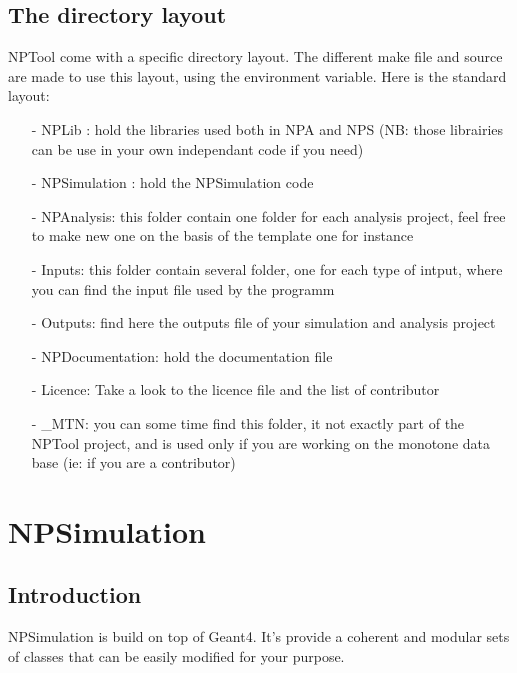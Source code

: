 \documentclass{book}
\begin{document}
				
				
\section{The directory layout}
	NPTool come with a specific directory layout. 
	The different make file and source are made to use this layout, using the environment variable. 
	Here is the standard layout:
		\begin{itemize}
			\item[-] NPLib : hold the libraries used both in NPA and NPS (NB: those librairies can be use in your own independant code if you need)
			\item[-] NPSimulation : hold the NPSimulation code
			\item[-] NPAnalysis: this folder contain one folder for each analysis project, feel free to make new one on the basis of the template one for instance
			\item[-] Inputs: this folder contain several folder, one for each type of intput, where you can find the input file used by the programm
			\item[-] Outputs: find here the outputs file of your simulation and analysis project
			\item[-] NPDocumentation: hold the documentation file
			\item[-] Licence: Take a look to the licence file and the list of contributor
			\item[-] \_MTN: you can some time find this folder, it not exactly part of the NPTool project, and is used only if you are working on the monotone data base (ie: if you are a contributor)
			\item[] 		
		\end{itemize}


				
\chapter[NPSimulation]{NPSimulation}

\section{Introduction}

NPSimulation is build on top of Geant4. It's provide a coherent and modular sets of classes that can be easily modified for your purpose.
\end{document}
